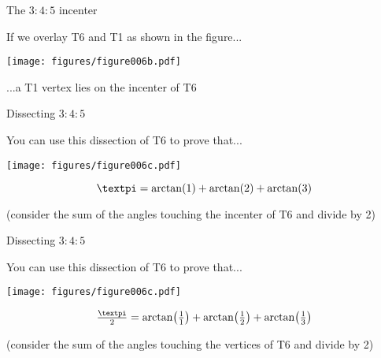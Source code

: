 \documentclass[14pt]{beamer}
\begin{document}

    \begin{frame}{The $3\!\!:\!\!4\!\!:\!\!5$ incenter}
        \begin{center}
            If we overlay T6 and T1 as shown in the figure...

            \bigskip \bigskip

            \texttt{[image: figures/figure006b.pdf]}

            \bigskip \bigskip

            ...a T1 vertex lies on the incenter of T6
        \end{center}
    \end{frame}


    \begin{frame}{Dissecting $3\!\!:\!\!4\!\!:\!\!5$}
        \begin{center}
            You can use this dissection of T6 to prove that...

            \bigskip\bigskip

            \texttt{[image: figures/figure006c.pdf]}\vspace{-1em}

            $$\text{\textpi} = \arctan{\!\left(1\right)} + \arctan{\!\left(2\right)} + \arctan{\!\left(3\right)}$$

            {\footnotesize(consider the sum of the angles touching the incenter of T6 and divide by 2)}
        \end{center}
    \end{frame}


    \begin{frame}{Dissecting $3\!\!:\!\!4\!\!:\!\!5$}
        \begin{center}
            You can use this dissection of T6 to prove that...

            \bigskip\bigskip

            \texttt{[image: figures/figure006c.pdf]}\vspace{-1em}

            $$\tfrac{\text{\textpi}}{2} = \arctan{\!\left(\tfrac{1}{1}\right)} + \arctan{\!\left(\tfrac{1}{2}\right)} + \arctan{\!\left(\tfrac{1}{3}\right)}$$

            {\footnotesize(consider the sum of the angles touching the vertices of T6 and divide by 2)}
        \end{center}
    \end{frame}
\end{document}
